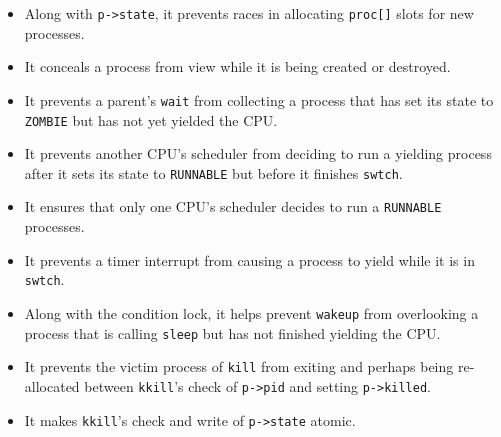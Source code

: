 \begin{itemize}

\item Along with \lstinline{p->state}, it prevents races in allocating
  \lstinline{proc[]} slots for new processes.

\item It conceals a process from view while it is being created
or destroyed.

\item It prevents a parent's \lstinline{wait} from collecting a
process that has set its state to \lstinline{ZOMBIE} but has
not yet yielded the CPU.

\item It prevents another CPU's scheduler from deciding to run
a yielding process after it sets its state to \lstinline{RUNNABLE} but
before it finishes \lstinline{swtch}.

\item It ensures that only one CPU's scheduler decides to run a
  \lstinline{RUNNABLE} processes.

\item It prevents a timer interrupt from causing a process to
yield while it is in \lstinline{swtch}.

\item Along with the condition lock, it helps prevent \lstinline{wakeup}
from overlooking a process that is calling \lstinline{sleep} but has not
finished yielding the CPU.

\item It prevents the victim process of \lstinline{kill} from exiting
and perhaps being re-allocated between \lstinline{kkill}'s check of 
\lstinline{p->pid} and setting \lstinline{p->killed}.

\item It makes \lstinline{kkill}'s check and write of \lstinline{p->state}
atomic.

\end{itemize}



